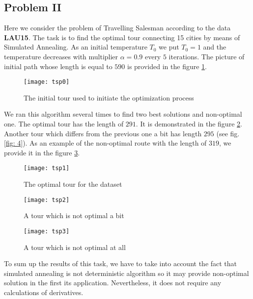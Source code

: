 \documentclass[12pt, bachelor, substylefile = algo_title.rtx]{disser}
\theoremstyle{definition}
\begin{document}
\subsection{Problem II}
Here we consider the problem of Travelling Salesman according to the data \textbf{LAU15}. The task is to find the optimal tour connecting 15 cities by means of Simulated Annealing. As an initial temperature $T_0$ we put $T_0 = 1$ and the temperature decreases with multiplier $\alpha = 0.9$ every $5$ iterations. The picture of initial path whose length is equal to $590$ is provided in the figure \ref{fig: 2}.

\begin{figure}[h]
\begin{center}
\texttt{[image: tsp0]}
\caption{The initial tour used to initiate the optimization process}
\label{fig: 2}
\end{center}
\end{figure}

We ran this algorithm several times to find two best solutions and non-optimal one. The optimal tour has the length of $291$. It is demonstrated in the figure \ref{fig: 3}. Another tour which differs from the previous one a bit has length $295$ (see fig. \ref{fig: 4}). As an example of the non-optimal route with the length of $319$, we provide it in the figure \ref{fig: 5}.

\begin{figure}[!h]
\begin{center}
\texttt{[image: tsp1]}
\caption{The optimal tour for the dataset}
\label{fig: 3}
\end{center}
\end{figure}

\begin{figure}[!h]
   \begin{minipage}{0.48\textwidth}
     \centering
     \texttt{[image: tsp2]}
     \caption{A tour which is not optimal a bit}
	\label{fig: 4}
   \end{minipage}\hfill
   \begin{minipage}{0.48\textwidth}
     \centering
     \texttt{[image: tsp3]}
     \caption{A tour which is not optimal at all}
	\label{fig: 5}
   \end{minipage}
\end{figure}

To sum up the results of this task, we have to take into account the fact that simulated annealing is not deterministic algorithm so it may provide non-optimal solution in the first its application. Nevertheless, it does not require any calculations of derivatives.
\end{document}
